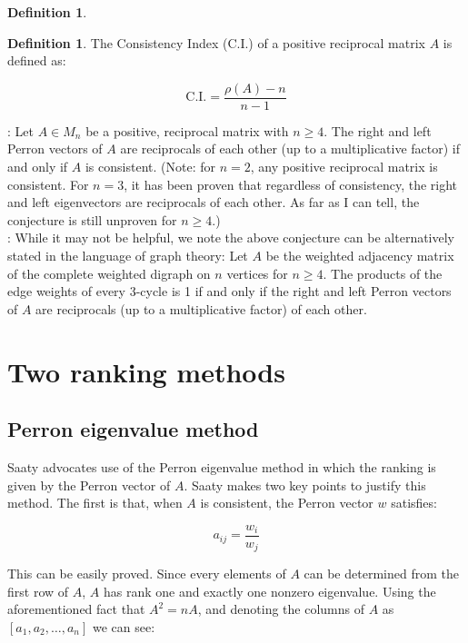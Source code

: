 \documentclass[a4,11pt,twoside,leqno]{report}
\theoremstyle{definition}
\newtheorem{defn}[thm]{Definition}
\theoremstyle{remark}
\numberwithin{equation}{section}
\begin{document}
\begin{defn}
\begin{defn} The Consistency Index (C.I.) of a positive reciprocal matrix $A$ is defined as:

$$\mbox{C.I.}=\frac{\rho(A)-n}{n-1}$$

\end{defn}

: Let $A\in M_n$ be a positive, reciprocal matrix with $n\geq 4$. The right and left Perron vectors of $A$ are reciprocals of each other (up to a multiplicative factor) if and only if $A$ is consistent.  (Note: for $n=2$, any positive reciprocal matrix is consistent. For $n=3$, it has been proven that regardless of consistency, the right and left eigenvectors are reciprocals of each other. As far as I can tell, the conjecture is still unproven for $n\geq4$.) \\

: While it may not be helpful, we note the above conjecture can be alternatively stated in the language of graph theory: Let $A$ be the weighted adjacency matrix of the complete weighted digraph on $n$ vertices for $n\geq 4$. The products of the edge weights of every 3-cycle is 1 if and only if the right and left Perron vectors of $A$ are reciprocals (up to a multiplicative factor) of each other.

\end{defn}

\section{Two ranking methods}

\subsection{Perron eigenvalue method}

Saaty advocates use of the Perron eigenvalue method in which the ranking is given by the Perron vector of $A$. Saaty makes two key points to justify this method. The first is that, when $A$ is consistent, the Perron vector $w$ satisfies:

$$a_{ij}=\frac{w_i}{w_j}$$

This can be easily proved. Since every elements of $A$ can be determined from the first row of $A$, $A$ has rank one and exactly one nonzero eigenvalue. Using the aforementioned fact that $A^2=nA$, and denoting the columns of $A$ as $[a_1,a_2,\dots,a_n]$ we can see:
\end{document}
